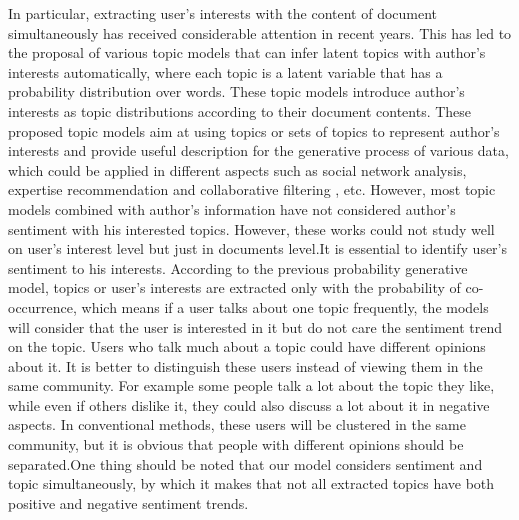 \documentclass[twocolumn]{svjour3}          %
\begin{document}
In particular, extracting user’s interests with the content of document simultaneously has received considerable attention in recent years. This has led to the proposal of various topic models that can infer latent topics with author’s interests automatically, where each topic is a latent variable that has a probability distribution over words. These topic models introduce author’s interests as topic distributions according to their document contents. These proposed topic models aim at using topics or sets of topics to represent author’s interests and provide useful description for the generative process of various data, which could be applied in different aspects such as social network analysis, expertise recommendation  and collaborative filtering , etc. \cite{zhao2012user}
However, most topic models combined with author’s information have not considered author’s sentiment with his interested topics.
However, these works could not study well on user’s interest level but just in documents level.It is essential to identify user’s sentiment to his interests. According to the previous probability generative model, topics or user’s interests are extracted only with the probability of co-occurrence, which means if a user talks about one topic frequently, the models will consider that the user is interested in it but do not care the sentiment trend on the topic. Users who talk much about a topic could have different opinions about it. It is better to distinguish these users instead of viewing them in the same community. For example some people talk a lot about the topic they like, while even if others dislike it, they could also discuss a lot about it in negative aspects. In conventional methods, these users will be clustered in the same community, but it is obvious that people with different opinions should be separated.One thing should be noted that our model considers sentiment and topic simultaneously, by which it makes that not all extracted topics have both positive and negative sentiment trends.
\end{document}

